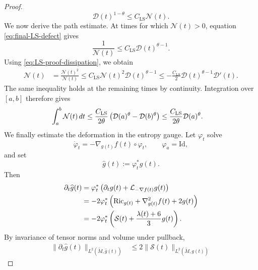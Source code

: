 \documentclass{amsart}
\begin{document}
\begin{proof}
\begin{equation}
\label{eq:final-LS-defect}
        \mathcal D(t)^{1-\theta}
        \leq
        C_{\mathrm{LS}}\mathcal N(t).
\end{equation}
We now derive the path estimate. At times for which
\(\mathcal N(t)>0\), equation \eqref{eq:final-LS-defect} gives
\[
        \frac{1}{\mathcal N(t)}
        \leq
        C_{\mathrm{LS}}\mathcal D(t)^{\theta-1}.
\]
Using \eqref{eq:LS-proof-dissipation}, we obtain
\[
\begin{aligned}
        \mathcal N(t)
        &=
        \frac{\mathcal N(t)^2}{\mathcal N(t)}\leq
        C_{\mathrm{LS}}
        \mathcal N(t)^2
        \mathcal D(t)^{\theta-1}\leq
        -\frac{C_{\mathrm{LS}}}{2}
        \mathcal D(t)^{\theta-1}\mathcal D'(t).
\end{aligned}
\]
The same inequality holds at the remaining times by continuity. Integration
over \([a,b]\) therefore gives
\begin{align}
        \int_a^b\mathcal N(t)\,dt
        &\leq
        \frac{C_{\mathrm{LS}}}{2\theta}
        \left(
        \mathcal D(a)^\theta
        -
        \mathcal D(b)^\theta
        \right)
        \notag
        \leq
        \frac{C_{\mathrm{LS}}}{2\theta}
        \mathcal D(a)^\theta.
\label{eq:LS-final-path-estimate}
\end{align}
\noindent We finally estimate the deformation in the entropy gauge. Let
\(\varphi_t\) solve
\[
        \dot\varphi_t
        =
        -\nabla_{g(t)}f(t)\circ\varphi_t,
        \qquad
        \varphi_a=\text{Id},
\]
and set
\[
        \widehat g(t):=\varphi_t^*g(t).
\]
Then
\begin{align}
        \partial_t\widehat g(t)
        &=
        \varphi_t^*
        \left(
        \partial_tg(t)
        +
        \mathcal L_{-\nabla f(t)}g(t)
        \right)
        \notag\\
        &=
        -2\varphi_t^*
        \left(
        \text{Ric}_{g(t)}
        +
        \nabla^2_{g(t)}f(t)
        +
        2g(t)
        \right)
        \notag\\
        &=
        -2\varphi_t^*
        \left(
        \mathcal S(t)
        +
        \frac{\lambda(t)+6}{3}g(t)
        \right).
\label{eq:entropy-gauge-evolution-proof}
\end{align}
By invariance of tensor norms and volume under pullback,
\begin{align}
        \|\partial_t\widehat g(t)\|
        _{L^2(\widetilde M,\widehat g(t))}
        &\leq
        2\|\mathcal S(t)\|_{L^2(\widetilde M,g(t))}

\end{align}
\end{proof}
\end{document}
